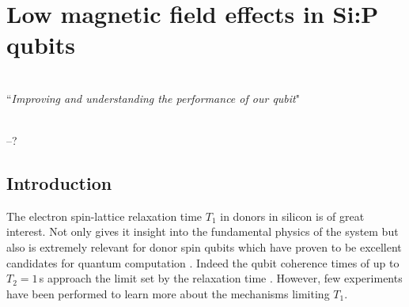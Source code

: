 
\chapter{Low magnetic field effects in Si:P qubits} %

\label{Chapter6} 


\HRule
\vspace{0.5cm} \hspace{2cm}
\small
\hangindent=4cm
\\
        ``\emph{Improving and understanding the performance of our qubit}"
\\ \\
\hangindent=4cm
\begin{flushright}
--? \\
\end{flushright}

\vspace{0.5cm}

\noindent \HRule
\clearpage



\section{\label{sec:introduction}Introduction}

The electron spin-lattice relaxation time $T_1$ in donors in silicon is of great interest. Not only gives it insight into the fundamental physics of the system but also is extremely relevant for donor spin qubits which have proven to be excellent candidates for quantum computation \cite{Muhonen2014, Muhonen2015}. Indeed the qubit coherence times of up to $T_2=1\,$s approach the limit set by the relaxation time \cite{Kalra2016}. However, few experiments have been performed to learn more about the mechanisms limiting $T_1$. 

